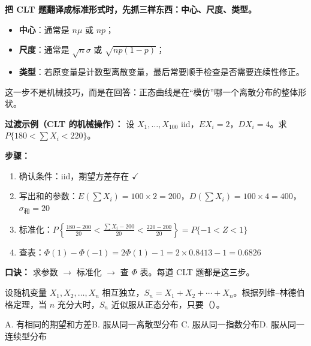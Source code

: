 ﻿\documentclass[lang=cn,11pt]{elegantbook}
\begin{document}
\begin{note}
\textbf{把 CLT 题翻译成标准形式时，先抓三样东西：中心、尺度、类型。}
\begin{itemize}
    \item \textbf{中心}：通常是 \(n\mu\) 或 \(np\)；
    \item \textbf{尺度}：通常是 \(\sqrt{n}\sigma\) 或 \(\sqrt{np(1-p)}\)；
    \item \textbf{类型}：若原变量是计数型离散变量，最后常要顺手检查是否需要连续性修正。
\end{itemize}

这一步不是机械技巧，而是在回答：正态曲线是在“模仿”哪一个离散分布的整体形状。
\end{note}

\begin{note}
\textbf{过渡示例（CLT 的机械操作）：} 设 $X_1,\dots,X_{100}$ iid，$EX_i=2$，$DX_i=4$。求 $P\{180<\sum X_i<220\}$。

\textbf{步骤：}
\begin{enumerate}
    \item 确认条件：iid，期望方差存在 $\checkmark$
    \item 写出和的参数：$E(\sum X_i)=100\times 2=200$，$D(\sum X_i)=100\times 4=400$，$\sigma_{\text{和}}=20$
    \item 标准化：$P\left\{\frac{180-200}{20}<\frac{\sum X_i-200}{20}<\frac{220-200}{20}\right\}=P\{-1<Z<1\}$
    \item 查表：$\Phi(1)-\Phi(-1)=2\Phi(1)-1=2\times 0.8413-1=0.6826$
\end{enumerate}
\textbf{口诀：} 求参数 $\to$ 标准化 $\to$ 查 $\Phi$ 表。每道 CLT 题都是这三步。
\end{note}

\begin{exercise}\label{exer:5-clt-condition}
设随机变量 \(X_1, X_2, \dots, X_n\) 相互独立，\(S_n = X_1 + X_2 + \cdots + X_n\)。根据列维--林德伯格定理，当 \(n\) 充分大时，\(S_n\) 近似服从正态分布，只要（\quad）。\par
A. 有相同的期望和方差\quad B. 服从同一离散型分布\quad
C. 服从同一指数分布\quad D. 服从同一连续型分布
\end{exercise}
\end{document}
